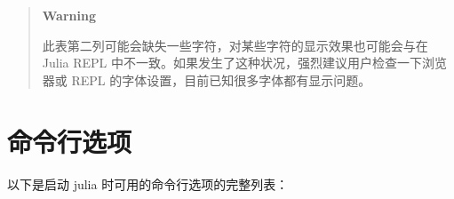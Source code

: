 \begin{quote}
\textbf{Warning}

此表第二列可能会缺失一些字符，对某些字符的显示效果也可能会与在 Julia REPL 中不一致。如果发生了这种状况，强烈建议用户检查一下浏览器或 REPL 的字体设置，目前已知很多字体都有显示问题。

\end{quote}






\hypertarget{7890528511117722792}{}


\chapter{命令行选项}



以下是启动 julia 时可用的命令行选项的完整列表：




